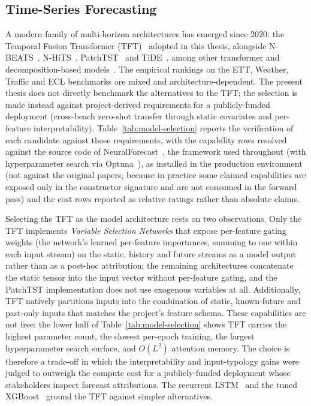 \documentclass[twocolumn,twoside,a4paper,10pt]{IEEEtran}
\begin{document}
\subsection{Time-Series Forecasting}\label{sec:relwork_tsforecast}

A modern family of multi-horizon architectures has emerged since 2020: the Temporal Fusion Transformer (TFT)~\cite{LimTFT2021} adopted in this thesis, alongside N-BEATS~\cite{Oreshkin2020NBEATS}, N-HiTS~\cite{Challu2023NHiTS}, PatchTST~\cite{Nie2023PatchTST} and TiDE~\cite{Das2023TiDE}, among other transformer and decomposition-based models~\cite{Zhou2021Informer,Wu2021Autoformer,Liu2024iTransformer,Hao2024STLTCN}. The empirical rankings on the ETT, Weather, Traffic and ECL benchmarks are mixed and architecture-dependent. The present thesis does not directly benchmark the alternatives to the TFT; the selection is made instead against project-derived requirements for a publicly-funded deployment (cross-beach zero-shot transfer through static covariates and per-feature interpretability). Table~\ref{tab:model-selection} reports the verification of each candidate against those requirements, with the capability rows resolved against the source code of NeuralForecast~\cite{neuralforecast2022}, the framework used throughout (with hyperparameter search via Optuna~\cite{Akiba2019Optuna}), as installed in the production environment (not against the original papers, because in practice some claimed capabilities are exposed only in the constructor signature and are not consumed in the forward pass) and the cost rows reported as relative ratings rather than absolute claims.

Selecting the TFT as the model architecture rests on two observations. Only the TFT implements \emph{Variable Selection Networks} that expose per-feature gating weights (the network's learned per-feature importances, summing to one within each input stream) on the static, history and future streams as a model output rather than as a post-hoc attribution; the remaining architectures concatenate the static tensor into the input vector without per-feature gating, and the PatchTST implementation does not use exogenous variables at all. Additionally, TFT natively partitions inputs into the combination of static, known-future and past-only inputs that matches the project's feature schema. These capabilities are not free: the lower half of Table~\ref{tab:model-selection} shows TFT carries the highest parameter count, the slowest per-epoch training, the largest hyperparameter search surface, and $O(L^2)$ attention memory. The choice is therefore a trade-off in which the interpretability and input-typology gains were judged to outweigh the compute cost for a publicly-funded deployment whose stakeholders inspect forecast attributions. The recurrent LSTM~\cite{Hochreiter1997LSTM} and the tuned XGBoost~\cite{Chen2016XGBoost} ground the TFT against simpler alternatives.
\end{document}
